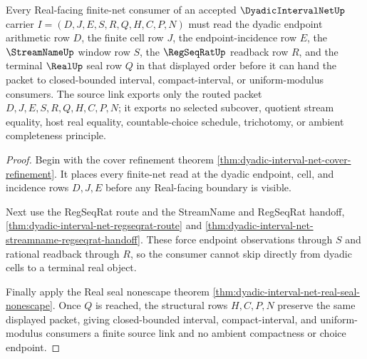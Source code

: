 \begin{theorem}\label{thm:dyadic-interval-net-real-source-link}
Every Real-facing finite-net consumer of an accepted $\DyadicIntervalNetUp$ carrier $I=(D,J,E,S,R,Q,H,C,P,N)$ must read the dyadic endpoint arithmetic row $D$, the finite cell row $J$, the endpoint-incidence row $E$, the $\StreamNameUp$ window row $S$, the $\RegSeqRatUp$ readback row $R$, and the terminal $\RealUp$ seal row $Q$ in that displayed order before it can hand the packet to closed-bounded interval, compact-interval, or uniform-modulus consumers. The source link exports only the routed packet $D,J,E,S,R,Q,H,C,P,N$; it exports no selected subcover, quotient stream equality, host real equality, countable-choice schedule, trichotomy, or ambient completeness principle.
\end{theorem}
\begin{proof}
Begin with the cover refinement theorem \autoref{thm:dyadic-interval-net-cover-refinement}. It places every finite-net read at the dyadic endpoint, cell, and incidence rows $D,J,E$ before any Real-facing boundary is visible.

Next use the RegSeqRat route and the StreamName and RegSeqRat handoff, \autoref{thm:dyadic-interval-net-regseqrat-route} and \autoref{thm:dyadic-interval-net-streamname-regseqrat-handoff}. These force endpoint observations through $S$ and rational readback through $R$, so the consumer cannot skip directly from dyadic cells to a terminal real object.

Finally apply the Real seal nonescape theorem \autoref{thm:dyadic-interval-net-real-seal-nonescape}. Once $Q$ is reached, the structural rows $H,C,P,N$ preserve the same displayed packet, giving closed-bounded interval, compact-interval, and uniform-modulus consumers a finite source link and no ambient compactness or choice endpoint.
\end{proof}


